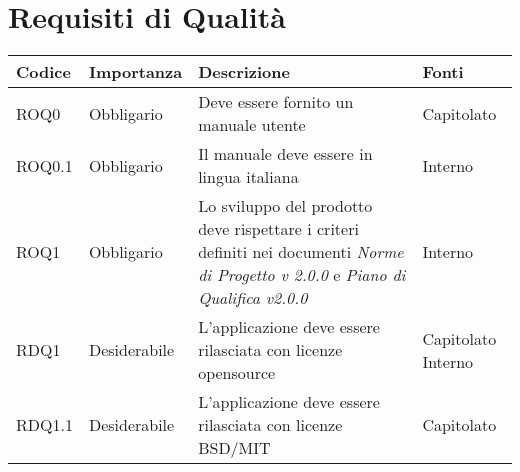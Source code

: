 \documentclass[../AnalisideiRequisiti.tex]{subfiles}
\begin{document}
	\section{Requisiti di Qualità}
			\begin{longtable}{| p{2cm} | p{2.5cm} |p{5cm} | p{2.5cm} |}
			\hline
			\textbf{Codice} & \textbf{Importanza} & \textbf{Descrizione} & \textbf{Fonti}\\
			\hline
			\endhead
				
			
			\newline ROQ0&\newline Obbligario&
			\newline Deve essere fornito un manuale utente&
			\newline Capitolato
			\\[1em]
			\hline
			\newline ROQ0.1&\newline Obbligario&
			\newline Il manuale deve essere in lingua italiana&
			\newline Interno
			\\[1em]
			\hline
			\newline ROQ1&\newline Obbligario&
			\newline Lo sviluppo del prodotto deve rispettare i
			criteri definiti nei documenti \textit{Norme di Progetto v 2.0.0} e \textit{Piano di Qualifica v2.0.0}&
			\newline Interno
			\\[1em]
			\hline
			\newline
			RDQ1&\newline Desiderabile&
			\newline 
			L'applicazione deve essere rilasciata con licenze opensource&
			\newline Capitolato \newline Interno
			\\[1em]
			\hline	
			\newline
			RDQ1.1&\newline Desiderabile&
			\newline 
			L'applicazione deve essere rilasciata con licenze BSD/MIT &
			\newline Capitolato
			\\[1em]
			\hline
	\end{longtable}
\newpage
\end{document}
